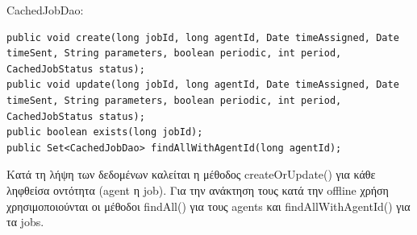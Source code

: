 \documentclass[a4paper,11pt]{article}
\begin{document}
\begin{sloppypar}
\begin{itemize}
CachedJobDao:

\begin{lstlisting}
public void create(long jobId, long agentId, Date timeAssigned, Date timeSent, String parameters, boolean periodic, int period, CachedJobStatus status);
public void update(long jobId, long agentId, Date timeAssigned, Date timeSent, String parameters, boolean periodic, int period, CachedJobStatus status);
public boolean exists(long jobId);
public Set<CachedJobDao> findAllWithAgentId(long agentId);
\end{lstlisting}

Κατά τη λήψη των δεδομένων καλείται η μέθοδος createOrUpdate() για κάθε ληφθείσα οντότητα (agent η job). Για την ανάκτηση τους κατά την offline χρήση χρησιμοποιούνται οι μέθοδοι findAll() για τους agents και findAllWithAgentId() για τα jobs.

\end{itemize}


\end{sloppypar}
\end{document}
